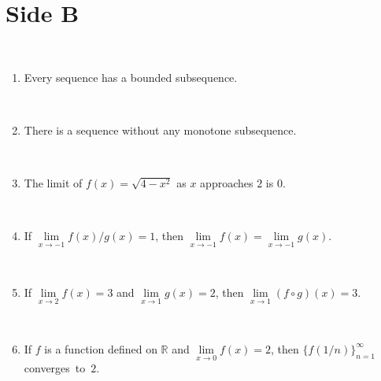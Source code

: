 \documentclass[12pt]{amsart}
\newcommand{\R}{{\mathbb{R}}}
\numberwithin{equation}{section}
\theoremstyle{plain} %
\theoremstyle{definition}
\theoremstyle{remark}
\begin{document}
\medskip
		
		\section*{Side B}
		
		\

		
		\begin{enumerate}
		
		
	\item  Every sequence has a bounded subsequence.
	
	\
	
	
	
	\item  There is a sequence without any monotone subsequence.
	
	\
	
	
	
	
	

	
	\item  The limit of $f(x)=\sqrt{4-x^2}$ as $x$ approaches $2$ is $0$.
	
	\
	

	 
	
	

	\item  If $\lim\limits_{x\to -1} f(x)/g(x) =1$, then $\lim\limits_{x\to -1} f(x)=\lim\limits_{x\to -1} g(x)$.
		
	\

	 

	 

 
 \item  If $\lim\limits_{x\to 2} f(x) = 3$ and $\lim\limits_{x\to 1} g(x) =2$, then $\lim\limits_{x\to 1} (f \circ g)(x) = 3$.


\
 

 
 	  \item  If $f$ is a function defined on $\R$ and $\lim\limits_{x\to 0} f(x)=2$, then $\{ f(1/n) \}_{n=1}^\infty$ converges~to~$2$.
 

\end{enumerate}
\end{document}
